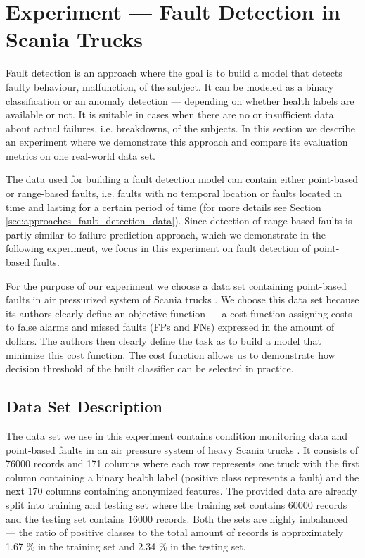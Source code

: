 \section{Experiment --- Fault Detection in Scania Trucks}
\label{sec:experiments_fault_detection}

Fault detection is an approach where the goal is to build a model that detects faulty behaviour, malfunction, of the subject.
It can be modeled as a binary classification or an anomaly detection --- depending on whether health labels are available or not.
It is suitable in cases when there are no or insufficient data about actual failures, i.e. breakdowns, of the subjects.
In this section we describe an experiment where we demonstrate this approach and compare its evaluation metrics on one real-world data set.

The data used for building a fault detection model can contain either point-based or range-based faults, i.e. faults with no temporal location or faults located in time and lasting for a certain period of time (for more details see Section \ref{sec:approaches_fault_detection_data}).
Since detection of range-based faults is partly similar to failure prediction approach, which we demonstrate in the following experiment, we focus in this experiment on fault detection of point-based faults.

For the purpose of our experiment we choose a data set containing point-based faults in air pressurized system of Scania trucks \cite{Dua:2019}.
We choose this data set because its authors clearly define an objective function --- a cost function assigning costs to false alarms and missed faults (FPs and FNs) expressed in the amount of dollars.
The authors then clearly define the task as to build a model that minimize this cost function.
The cost function allows us to demonstrate how decision threshold of the built classifier can be selected in practice.

\subsection{Data Set Description}

The data set we use in this experiment contains condition monitoring data and point-based faults in an air pressure system of heavy Scania trucks \cite{Dua:2019}.
It consists of 76000 records and 171 columns where each row represents one truck with the first column containing a binary health label (positive class represents a fault) and the next 170 columns containing anonymized features.
The provided data are  already split into training and testing set where the training set contains 60000 records and the testing set contains 16000 records.
Both the sets are highly imbalanced --- the ratio of positive classes to the total amount of records is approximately 1.67 \% in the training set and 2.34 \% in the testing set.

